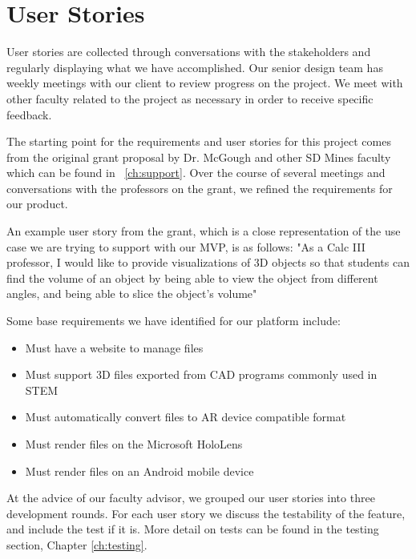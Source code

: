 \section{User Stories}


User stories are collected through conversations with the stakeholders and
regularly displaying what we have accomplished. Our senior design team has
weekly meetings with our client to review progress on the project. We meet
with other faculty related to the project as necessary in order to receive
specific feedback.

The starting point for the requirements and user stories for this project comes
from the original grant proposal by Dr. McGough and other SD Mines faculty
which can be found in ~\autoref{ch:support}. Over the course of several
meetings and conversations with the professors on the grant, we refined the
requirements for our product.

An example user story from the grant, which is a close representation of the
use case we are trying to support with our MVP, is as follows: "As a Calc III
professor, I would like to provide visualizations of 3D objects so that
students can find the volume of an object by being able to view the object
from different angles, and being able to slice the object's volume"

Some base requirements we have identified for our platform include:
\begin{itemize}
	\item Must have a website to manage files
	\item Must support 3D files exported from CAD programs commonly used in STEM
	\item Must automatically convert files to AR device compatible format
	\item Must render files on the Microsoft HoloLens
	\item Must render files on an Android mobile device
\end{itemize}

At the advice of our faculty advisor, we grouped our user stories into three 
development rounds. For each user story we discuss the testability of the 
feature, and include the test if it is. More detail on tests can be found in the testing section, Chapter \ref{ch:testing}.


